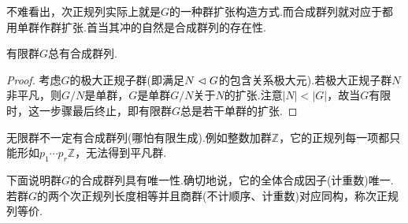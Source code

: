 不难看出，次正规列实际上就是$G$的一种群扩张构造方式.而合成群列就对应于都用单群作群扩张.首当其冲的自然是合成群列的存在性.
\begin{lemma*}
	有限群$G$总有合成群列.
\end{lemma*}
\begin{proof}
	考虑$G$的极大正规子群(即满足$N\vartriangleleft G$的包含关系极大元).若极大正规子群$N$非平凡，则$G/N$是单群，$G$是单群$G/N$关于$N$的扩张.注意$|N|<|G|$，故当$G$有限时，这一步骤最后终止，即有限群$G$总是若干单群的扩张.
\end{proof}
\begin{remark}
	无限群不一定有合成群列(哪怕有限生成).例如整数加群$\mathbb{Z}$，它的正规列每一项都只能形如$p_1\cdots p_r\mathbb{Z}$，无法得到平凡群.
\end{remark}

下面说明群$G$的合成群列具有唯一性.确切地说，它的全体合成因子(计重数)唯一.若群$G$的两个次正规列长度相等并且商群(不计顺序、计重数)对应同构，称次正规列{\heiti 等价}.

